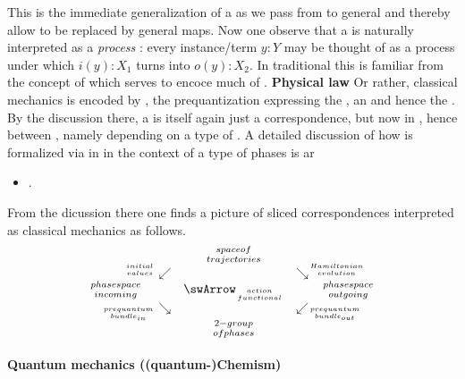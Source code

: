 This is the immediate generalization of a  as we pass from  to general  and thereby allow  to be replaced by general maps.
Now one observe that a  is naturally interpreted as a \emph{process} :
every instance/term $y\colon Y$ may be thought of as a process under which $i(y) \colon X_1$ turns into $o(y) \colon X_2$.
In traditional  this is familiar from the concept of  which serves to encoce much of .
\textbf{Physical law}
Or rather, classical mechanics is encoded by , the prequantization expressing the , an  and hence the .
By the discussion there, a  is itself again just a correspondence, but now in , hence between , namely depending on a type of .
A detailed discussion of how  is formalized via  in  in the context of a type of phases is ar
\begin{itemize}%
\item {}.
\end{itemize}
From the dicussion there one finds a picture of sliced correspondences interpreted as classical mechanics as follows.
\begin{displaymath}
\itexarray{
&& {{spaceof} \atop {trajectories}}
\\
& {}^{\mathllap{{initial}\atop {values}}}\swarrow && \searrow^{\mathrlap{{Hamiltonian} \atop {evolution}}}
\\
{{phasespace} \atop {incoming}}
&& \swArrow_{{action} \atop {functional}} && {{phasespace} \atop {outgoing}}
\\
& {}_{\mathllap{{prequantum}\atop {bundle}_{in}}}\searrow
&&
\swarrow_{\mathrlap{{prequantum} \atop {bundle}_{out}}}
\\
&& {{2-group} \atop {ofphases}}
}
\end{displaymath}
\hypertarget{quantum_mechanics_quantumchemism}{}\paragraph*{{Quantum mechanics ((quantum-)Chemism)}}\label{quantum_mechanics_quantumchemism}
